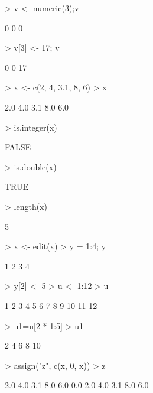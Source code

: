 \documentclass{article}
\begin{document}
\begin{Schunk}
\begin{Sinput}
> v <- numeric(3);v
\end{Sinput}
\begin{Soutput}
[1] 0 0 0
\end{Soutput}
\begin{Sinput}
> v[3] <- 17; v
\end{Sinput}
\begin{Soutput}
[1]  0  0 17
\end{Soutput}
\begin{Sinput}
> x <- c(2, 4, 3.1, 8, 6)
> x
\end{Sinput}
\begin{Soutput}
[1] 2.0 4.0 3.1 8.0 6.0
\end{Soutput}
\begin{Sinput}
> is.integer(x) 
\end{Sinput}
\begin{Soutput}
[1] FALSE
\end{Soutput}
\begin{Sinput}
> is.double(x)
\end{Sinput}
\begin{Soutput}
[1] TRUE
\end{Soutput}
\begin{Sinput}
> length(x)
\end{Sinput}
\begin{Soutput}
[1] 5
\end{Soutput}
\begin{Sinput}
> x <- edit(x)
> y = 1:4; y
\end{Sinput}
\begin{Soutput}
[1] 1 2 3 4
\end{Soutput}
\begin{Sinput}
> y[2] <- 5
> u <- 1:12
> u
\end{Sinput}
\begin{Soutput}
 [1]  1  2  3  4  5  6  7  8  9 10 11 12
\end{Soutput}
\begin{Sinput}
> u1=u[2 * 1:5]
> u1
\end{Sinput}
\begin{Soutput}
[1]  2  4  6  8 10
\end{Soutput}
\begin{Sinput}
> assign("z", c(x, 0, x))
> z
\end{Sinput}
\begin{Soutput}
 [1] 2.0 4.0 3.1 8.0 6.0 0.0 2.0 4.0 3.1 8.0 6.0
\end{Soutput}

\end{Schunk}
\end{document}
